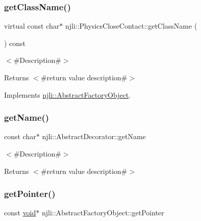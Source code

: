 \subsubsection{\texorpdfstring{get\+Class\+Name()}{getClassName()}}
{\footnotesize\ttfamily virtual const char$\ast$ njli\+::\+Physics\+Close\+Contact\+::get\+Class\+Name (\begin{DoxyParamCaption}{ }\end{DoxyParamCaption}) const\hspace{0.3cm}{\ttfamily [virtual]}}

$<$\#\+Description\#$>$

\begin{DoxyReturn}{Returns}
$<$\#return value description\#$>$ 
\end{DoxyReturn}


Implements \mbox{\hyperlink{classnjli_1_1_abstract_factory_object_af4151e41b80d5bc3fc42822c67fc2278}{njli\+::\+Abstract\+Factory\+Object}}.

\mbox{\label{classnjli_1_1_physics_close_contact_ad41266885be835f3ee602311e20877a4}} 
\subsubsection{\texorpdfstring{get\+Name()}{getName()}}
{\footnotesize\ttfamily const char$\ast$ njli\+::\+Abstract\+Decorator\+::get\+Name}

$<$\#\+Description\#$>$

\begin{DoxyReturn}{Returns}
$<$\#return value description\#$>$ 
\end{DoxyReturn}
\mbox{\label{classnjli_1_1_physics_close_contact_ac4ca71716ed832be357f15f8262c8448}} 
\subsubsection{\texorpdfstring{get\+Pointer()}{getPointer()}}
{\footnotesize\ttfamily const \mbox{\hyperlink{_thread_8h_af1e856da2e658414cb2456cb6f7ebc66}{void}}$\ast$ njli\+::\+Abstract\+Factory\+Object\+::get\+Pointer}


